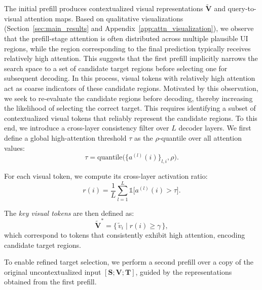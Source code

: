 \documentclass{article}
\begin{document}
The initial prefill produces contextualized visual representations $\tilde{\mathbf{V}}$ and query-to-visual attention maps. Based on qualitative visualizations (Section~\ref{sec:main_results} and Appendix~\ref{app:attn_visualization}), we observe that the prefill-stage attention is often distributed across multiple plausible UI regions, while the region corresponding to the final prediction typically receives relatively high attention. This suggests that the first prefill implicitly narrows the search space to a set of candidate target regions before selecting one for subsequent decoding. 
In this process, visual tokens with relatively high attention act as coarse indicators of these candidate regions.
Motivated by this observation, we seek to re-evaluate the candidate regions before decoding, thereby increasing the likelihood of selecting the correct target. This requires identifying a subset of contextualized visual tokens that reliably represent the candidate regions.
To this end, we introduce a cross-layer consistency filter over $L$ decoder layers. We first define a global high-attention threshold $\tau$ as the $\rho$-quantile over all attention values:
\begin{equation}
\tau = \mathrm{quantile}\!\bigl(\{a^{(l)}(i)\}_{l,i}, \rho\bigr).
\label{eq:threshold}
\end{equation}

For each visual token, we compute its cross-layer activation ratio:
\begin{equation}
r(i) = \frac{1}{L} \sum_{l=1}^{L} \mathds{1}\!\bigl[a^{(l)}(i) > \tau\bigr].
\end{equation}

The \emph{key visual tokens} are then defined as:
\begin{equation}
\tilde{\mathbf{V}}^{*} = \{\, \tilde{v}_i \mid r(i) \ge \gamma \,\},
\label{eq:ratio}
\end{equation}
which correspond to tokens that consistently exhibit high attention, encoding candidate target regions.


To enable refined target selection, we perform a second prefill over a copy of the original uncontextualized input $[\mathbf{S}; \mathbf{V}; \mathbf{T}]$, guided by the representations obtained from the first prefill. 
\end{document}
